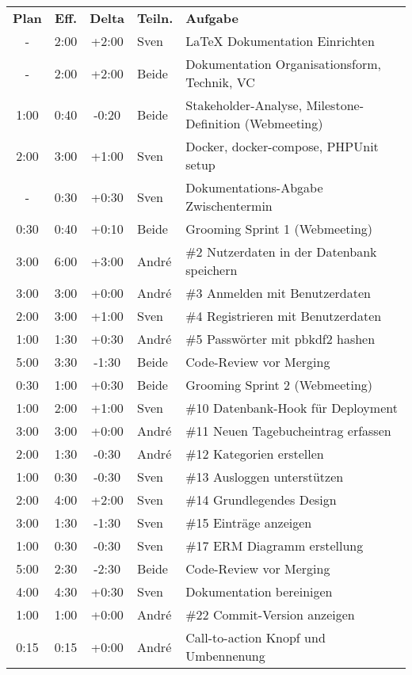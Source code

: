 \begin{longtable}{ c c c l l }
  \textbf{Plan} & \textbf{Eff.} & \textbf{Delta} & \textbf{Teiln.} & \textbf{Aufgabe} \\
  - & 2:00 & +2:00 & Sven & LaTeX Dokumentation Einrichten \\
  - & 2:00 & +2:00 & Beide & Dokumentation Organisationsform, Technik, VC\\
  1:00 & 0:40 & -0:20 & Beide & Stakeholder-Analyse, Milestone-Definition (Webmeeting) \\
  2:00 & 3:00 & +1:00 & Sven & Docker, docker-compose, PHPUnit setup \\
  - & 0:30 & +0:30 & Sven & Dokumentations-Abgabe Zwischentermin \\ 
  0:30 & 0:40 & +0:10 & Beide & Grooming Sprint 1 (Webmeeting) \\
  3:00 & 6:00 & +3:00 & André & \#2 Nutzerdaten in der Datenbank speichern \\
  3:00 & 3:00 & +0:00 & André & \#3 Anmelden mit Benutzerdaten \\
  2:00 & 3:00 & +1:00 & Sven & \#4 Registrieren mit Benutzerdaten \\
  1:00 & 1:30 & +0:30 & André & \#5 Passwörter mit pbkdf2 hashen \\
  5:00 & 3:30 & -1:30 & Beide & Code-Review vor Merging \\
  0:30 & 1:00 & +0:30 & Beide & Grooming Sprint 2 (Webmeeting) \\
  1:00 & 2:00 & +1:00 & Sven & \#10 Datenbank-Hook für Deployment \\
  3:00 & 3:00 & +0:00 & André & \#11 Neuen Tagebucheintrag erfassen \\
  2:00 & 1:30 & -0:30 & André & \#12 Kategorien erstellen \\
  1:00 & 0:30 & -0:30 & Sven & \#13 Ausloggen unterstützen \\
  2:00 & 4:00 & +2:00 & Sven & \#14 Grundlegendes Design \\
  3:00 & 1:30 & -1:30 & Sven & \#15 Einträge anzeigen \\
  1:00 & 0:30 & -0:30 & Sven & \#17 ERM Diagramm erstellung \\
  5:00 & 2:30 & -2:30 & Beide & Code-Review vor Merging \\
  4:00 & 4:30 & +0:30 & Sven & Dokumentation bereinigen \\
  1:00 & 1:00 & +0:00 & André & \#22 Commit-Version anzeigen \\
  0:15 & 0:15 & +0:00 & André & Call-to-action Knopf und Umbennenung \\

\end{longtable}
